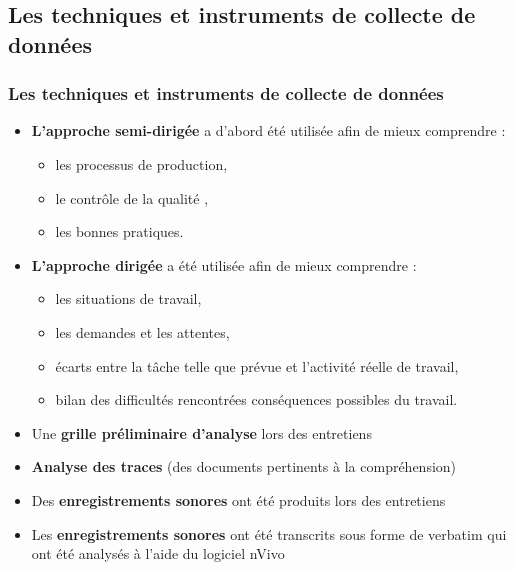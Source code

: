                        		 \subsection{Les techniques et instruments de collecte de données} 
					\begin{frame}[allowframebreaks]
						\frametitle{Les techniques et instruments de collecte de données}
                        
                        			\begin{itemize} 
                       				\item \textbf{L’approche semi-dirigée} a d’abord été utilisée afin de mieux comprendre :
                       				\begin{itemize}
                       				 	\item les processus de production, 
                       				 	\item le contrôle de la qualité ,
                       				 	\item les bonnes pratiques.
                       				 \end{itemize}
                       				\framebreak
                       				\item \textbf{L’approche dirigée} a été utilisée afin de mieux comprendre :
                       				\begin{itemize}
                       					\item les situations de travail,
                       					\item les demandes et les attentes,
                       					\item écarts entre la tâche telle que prévue et l’activité réelle de travail,
                       					\item bilan des difficultés rencontrées conséquences possibles du travail.
							\end{itemize}
							\item Une \textbf{grille préliminaire d’analyse} lors des entretiens
							\item \textbf{Analyse des traces} (des documents pertinents à la compréhension)
							\item Des \textbf{enregistrements sonores} ont été produits lors des entretiens
							\item Les \textbf{enregistrements sonores} ont été transcrits sous forme de verbatim qui ont été analysés à l’aide du logiciel nVivo
                       		 	\end{itemize}
                       		           
                			\end{frame}
                
